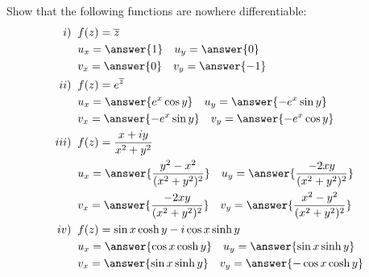 \documentclass[handout]{ximera}
\begin{document}
\begin{problem}
Show that the following functions are nowhere differentiable:
\begin{align*}
i) \;\; & f(z) = \overline{z} \\
& u_x = \answer{1} \quad u_y = \answer{0} \\
& v_x = \answer{0} \quad v_y = \answer{-1} \\
ii) \;\; & f(z) = e^{\overline{z}} \\
& u_x = \answer{e^x \cos y} \quad u_y = \answer{-e^x \sin y} \\
& v_x = \answer{-e^x \sin y} \quad v_y = \answer{-e^x \cos y} \\
iii) \;\; & f(z) = \frac{x+iy}{x^2 + y^2} \\
& u_x = \answer{\frac{y^2 -x^2}{(x^2 +y^2)^2}} \quad u_y = \answer{\frac{-2xy}{(x^2 +y^2)^2}}\\
& v_x = \answer{\frac{-2xy}{(x^2 +y^2)^2}} \quad v_y = \answer{\frac{x^2 - y^2}{(x^2 +y^2)^2}} \\
iv) \;\; & f(z) = \sin x \cosh y - i \cos x \sinh y \\
& u_x = \answer{\cos x \cosh y} \quad u_y = \answer{\sin x \sinh y} \\ 
& v_x = \answer{\sin x \sinh y} \quad v_y = \answer{-\cos x \cosh y} 
\end{align*}
\end{problem}
\end{document}
